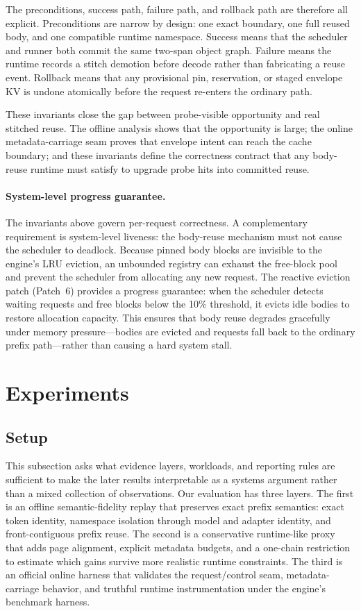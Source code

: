 \documentclass[conference]{IEEEtran}
\begin{document}
The preconditions, success path, failure path, and rollback path are therefore all explicit. Preconditions are narrow by design: one exact boundary, one full reused body, and one compatible runtime namespace. Success means that the scheduler and runner both commit the same two-span object graph. Failure means the runtime records a stitch demotion before decode rather than fabricating a reuse event. Rollback means that any provisional pin, reservation, or staged envelope KV is undone atomically before the request re-enters the ordinary path.

These invariants close the gap between probe-visible opportunity and real stitched reuse. The offline analysis shows that the opportunity is large; the online metadata-carriage seam proves that envelope intent can reach the cache boundary; and these invariants define the correctness contract that any body-reuse runtime must satisfy to upgrade probe hits into committed reuse.

\paragraph{System-level progress guarantee.}
The invariants above govern per-request correctness. A complementary requirement is system-level liveness: the body-reuse mechanism must not cause the scheduler to deadlock. Because pinned body blocks are invisible to the engine's LRU eviction, an unbounded registry can exhaust the free-block pool and prevent the scheduler from allocating any new request. The reactive eviction patch (Patch~6) provides a progress guarantee: when the scheduler detects waiting requests and free blocks below the 10\% threshold, it evicts idle bodies to restore allocation capacity. This ensures that body reuse degrades gracefully under memory pressure---bodies are evicted and requests fall back to the ordinary prefix path---rather than causing a hard system stall.

\section{Experiments}

\subsection{Setup}

This subsection asks what evidence layers, workloads, and reporting rules are sufficient to make the later results interpretable as a systems argument rather than a mixed collection of observations. Our evaluation has three layers. The first is an offline semantic-fidelity replay that preserves exact prefix semantics: exact token identity, namespace isolation through model and adapter identity, and front-contiguous prefix reuse. The second is a conservative runtime-like proxy that adds page alignment, explicit metadata budgets, and a one-chain restriction to estimate which gains survive more realistic runtime constraints. The third is an official online harness that validates the request/control seam, metadata-carriage behavior, and truthful runtime instrumentation under the engine's benchmark harness.
\end{document}
